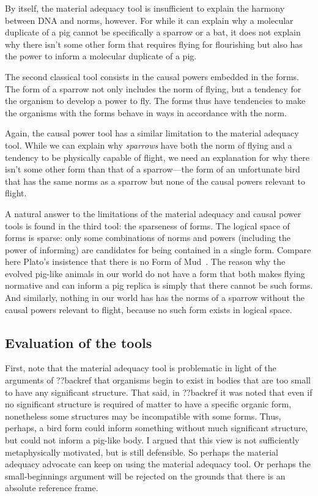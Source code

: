 By itself, the material adequacy tool is insufficient to explain the harmony between DNA and norms, however. For while 
it can explain why a molecular duplicate of a pig cannot be specifically a sparrow or a bat, it does not explain why there 
isn't some other form that requires flying for flourishing but also has the power to inform a molecular duplicate of a pig.

The second classical tool consists in the causal powers embedded in the forms. The form of a sparrow not only includes the 
norm of flying, but a tendency for the organism to develop a power to fly. The forms thus have tendencies to make the organisms
with the forms behave in ways in accordance with the norm.

Again, the causal power tool has a similar limitation to the material adequacy tool. While we can explain why \textit{sparrows}
have both the norm of flying and a tendency to be physically capable of flight, we need an explanation for why there isn't some 
other form than that of a sparrow---the form of an unfortunate bird that has the same norms as a sparrow but none of the causal 
powers relevant to flight. 

A natural answer to the limitations of the material adequacy and causal power tools is found in the third tool: the sparseness 
of forms. The logical space of forms is sparse: only some combinations of norms and powers (including 
the power of informing) are candidates for being contained in a single form. Compare here Plato's insistence that there is 
no Form of Mud~\parencite[\textit{Parmenides} 130cd]{PlatoDialogues}. The reason why the evolved pig-like animals in our world do not have a form that both makes 
flying normative and can inform a pig replica is simply that there cannot be such forms. And similarly, nothing in our world 
has has the norms of a sparrow without the causal powers relevant to flight, because no such form exists in logical space.

\subsection{Evaluation of the tools}\label{sec:eval}
First, note that the material adequacy tool is problematic in light of the arguments of ??backref that organisms begin 
to exist in bodies that are too small to have any significant structure. That said, in ??backref it was noted that even 
if no significant structure is required of matter to have a specific organic form, nonetheless some structures may be 
incompatible with some forms. Thus, perhaps, a bird form could inform something without much significant structure, but 
could not inform a pig-like body. I argued that this view is not sufficiently metaphysically motivated, but is still
defensible. So perhaps the material adequacy advocate can keep on using the material adequacy tool. Or perhaps the
small-beginnings argument will be rejected on the grounds that there is an absolute reference frame.

